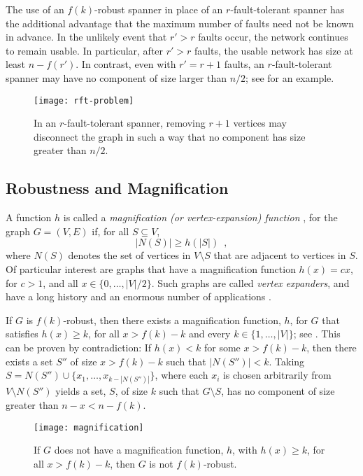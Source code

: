 \documentclass{sig-alternate}
\makeatletter
\def\ScaleIfNeeded{%
\ifdim\Gin@nat@width>.97\linewidth
.97\linewidth
\else
\Gin@nat@width
\fi
}
\makeatother
\begin{document}
The use of an $f(k)$-robust spanner in place of an $r$-fault-tolerant
spanner has the additional advantage that the maximum number of faults
need not be known in advance.  In the unlikely event that $r'> r$
faults occur, the network continues to remain usable.  In particular,
after $r'>r$ faults, the usable network has size at least $n-f(r')$. In
contrast, even with $r'=r+1$ faults, an $r$-fault-tolerant spanner may
have no component of size larger than $n/2$; see 
for an example.

\begin{figure}
  \begin{center}
    \texttt{[image: rft-problem]}
  \end{center}
  \caption{In an $r$-fault-tolerant spanner, removing $r+1$ vertices may
  disconnect the graph in such a way that no component has size greater
  than $n/2$.}
\end{figure}

\subsection{Robustness and Magnification}

A function $h$ is called a \emph{magnification (or vertex-expansion)
function} \cite[Page~390]{kalai91}, for the graph $G=(V,E)$ if, for all
$S\subseteq V$,
\[
    |N(S)| \ge h(|S|) \enspace ,
\]
where $N(S)$ denotes the set of vertices in $V\setminus S$ that are
adjacent to vertices in $S$.  Of particular interest are graphs
that have a magnification function $h(x)=cx$, for $c>1$, and
all $x\in\{0,\ldots,|V|/2\}$.  Such graphs are called \emph{vertex
expanders}, and have a long history and an enormous number of applications
\cite{hlw06}.

If $G$ is $f(k)$-robust, then there exists a magnification function,
$h$, for $G$ that satisfies $h(x) \ge k$, for all $x> f(k)-k$ and
every $k\in\{1,\ldots,|V|\}$; see .  This can
be proven by contradiction: If $h(x) < k$ for some $x> f(k)-k$, then
there exists a set $S''$ of size $x>f(k)-k$ such that $|N(S'')|< k$.
Taking $S=N(S'')\cup\{x_1,\ldots,x_{k-|N(S'')|}\}$, where each $x_i$ is
chosen arbitrarily from $V\setminus N(S'')$ yields a set, $S$, of size
$k$ such that $G\setminus S$, has no component of size greater than $n-x
< n-f(k)$.

\begin{figure}
  \begin{center}
    \texttt{[image: magnification]}
  \end{center}
  \caption{If $G$ does not have a magnification function, $h$, with
  $h(x)\ge k$, for all $x> f(k)-k$, then $G$ is not $f(k)$-robust.}
\end{figure}
\end{document}
